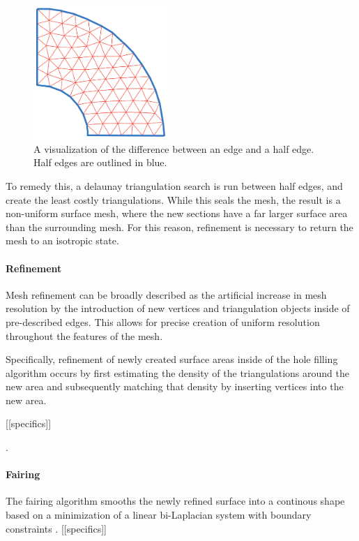 \documentclass[12pt]{drexelthesis}
\begin{document}
\begin{figure}[!ht]
	\centering
		\includegraphics[width=2in]{edgevshalfedge.png}
		\caption[Example of an edge vs. a half edge]{\centering A visualization of the difference between an edge and a half edge. Half edges are outlined in blue.}
\end{figure}

To remedy this, a delaunay triangulation search is run between half edges, and create the least costly triangulations. While this seals the mesh, the result is a non-uniform surface mesh, where the new sections have a far larger surface area than the surrounding mesh. For this reason, refinement is necessary to return the mesh to an isotropic state.

\paragraph{Refinement}
Mesh refinement can be broadly described as the artificial increase in mesh resolution by the introduction of new vertices and triangulation objects inside of pre-described edges. This allows for precise creation of uniform resolution throughout the features of the mesh.

Specifically, refinement of newly created surface areas inside of the hole filling algorithm occurs by first estimating the density of the triangulations around the new area and subsequently matching that density by inserting vertices into the new area.

[[specifics]]

\cite{meshrefinement}.

\paragraph{Fairing}
The fairing algorithm smooths the newly refined surface into a continous shape based on a minimization of a linear bi-Laplacian system with boundary constraints \cite{meshfairing}. [[specifics]]
\end{document}
